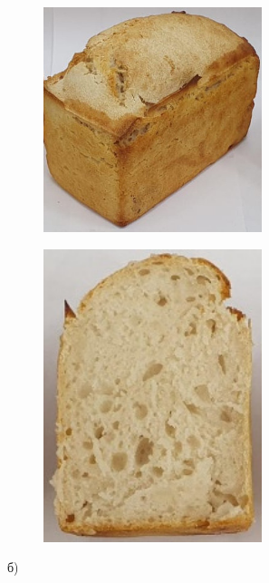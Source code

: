 \begin{figure}[H]
	\centering
	\begin{subfigure}{0.48\textwidth}
		\centering
		\includegraphics[width=0.7\textwidth,height=0.7\textwidth]{media/pish/image63}
	\end{subfigure}
	\begin{subfigure}{0.48\textwidth}
		\centering
		\includegraphics[width=0.7\textwidth,height=0.7\textwidth]{media/pish/image64}
	\end{subfigure}
	\caption*{б)}
\end{figure}

